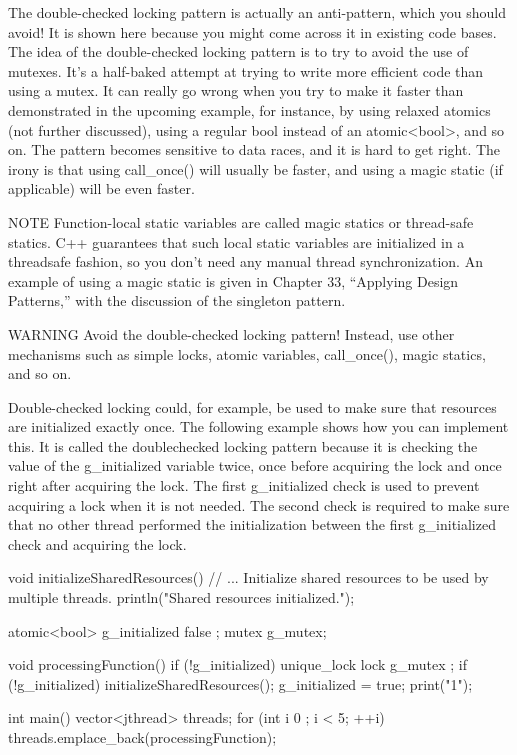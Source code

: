 
The double-checked locking pattern is actually an anti-pattern, which you should avoid! It is shown here because you might come across it in existing code bases. The idea of the double-checked locking pattern is to try to avoid the use of mutexes. It’s a half-baked attempt at trying to write more efficient code than using a mutex. It can really go wrong when you try to make it faster than demonstrated in the upcoming example, for instance, by using relaxed atomics (not further discussed), using a regular bool instead of an atomic<bool>, and so on. The pattern becomes sensitive to data races, and it is hard to get right. The irony is that using call\_once() will usually be faster, and using a magic static (if applicable) will be even faster.

\begin{myNotic}{NOTE}
Function-local static variables are called magic statics or thread-safe statics. C++ guarantees that such local static variables are initialized in a threadsafe fashion, so you don’t need any manual thread synchronization. An example of using a magic static is given in Chapter 33, “Applying Design Patterns,” with the discussion of the singleton pattern.
\end{myNotic}

\begin{myWarning}{WARNING}
Avoid the double-checked locking pattern! Instead, use other mechanisms such as simple locks, atomic variables, call\_once(), magic statics, and so on.
\end{myWarning}

Double-checked locking could, for example, be used to make sure that resources are initialized exactly once. The following example shows how you can implement this. It is called the doublechecked locking pattern because it is checking the value of the g\_initialized variable twice, once before acquiring the lock and once right after acquiring the lock. The first g\_initialized check is used to prevent acquiring a lock when it is not needed. The second check is required to make sure that no other thread performed the initialization between the first g\_initialized check and acquiring the lock.

\begin{cpp}
void initializeSharedResources()
{
    // ... Initialize shared resources to be used by multiple threads.
    println("Shared resources initialized.");
}

atomic<bool> g_initialized { false };
mutex g_mutex;

void processingFunction()
{
    if (!g_initialized) {
        unique_lock lock { g_mutex };
        if (!g_initialized) {
            initializeSharedResources();
            g_initialized = true;
        }
    }
    print("1");
}

int main()
{
    vector<jthread> threads;
    for (int i { 0 }; i < 5; ++i) {
        threads.emplace_back(processingFunction);
    }
}
\end{cpp}

